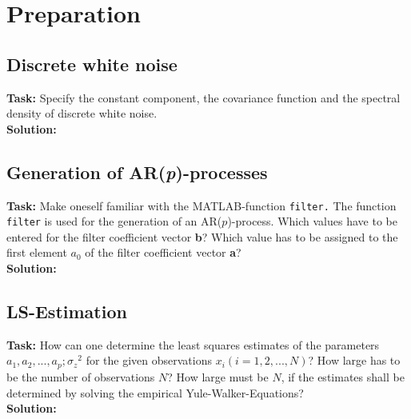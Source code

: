  \chapter{Preparation}

\section{Discrete white noise }
\noindent \textbf{Task:} Specify the constant component, the covariance function and the spectral density of discrete white noise.\\
\noindent \textbf{Solution:}\\




\section{Generation of AR(\textit{p})-processes}
\noindent \textbf{Task:} Make oneself familiar with the MATLAB-function \texttt{filter.} The function \texttt{filter} is used for the generation of an AR($p$)-process. Which values have to be entered for the filter coefficient vector \textbf{b}? Which value has to be assigned to the first element $a_0$ of the filter coefficient vector \textbf{a}?\\
\noindent \textbf{Solution:}\\




\section{LS-Estimation}
\noindent \textbf{Task:} How can one determine the least squares estimates of the parameters $a_1 , a_2 ,..., a_p ;{\sigma_z}^2$ for the given observations $x_i ( i = 1,2,...,N )$? How large has to be the number of observations $N$? How large must be $N$, if the estimates shall be determined by solving the empirical Yule-Walker-Equations?
\\
\noindent \textbf{Solution:}\\




